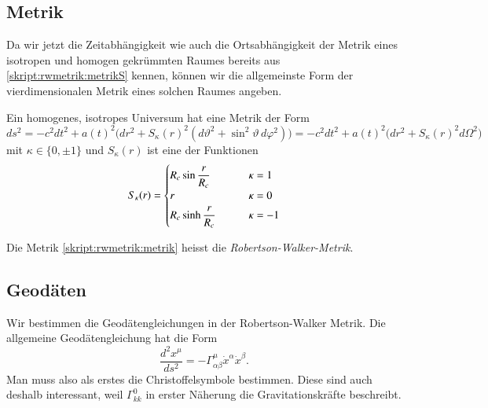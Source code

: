 \subsection{Metrik}
Da wir jetzt die Zeitabhängigkeit wie auch die Ortsabhängigkeit der
Metrik eines isotropen und homogen gekrümmten Raumes bereits aus
\eqref{skript:rwmetrik:metrikS} kennen, können
wir die allgemeinste Form der vierdimensionalen Metrik eines solchen
Raumes angeben.

\begin{satz}
Ein homogenes, isotropes Universum hat eine Metrik der Form
\begin{equation}
ds^2
=
-c^2 dt^2 + a(t)^2\bigl(
dr^2 + S_\kappa(r)^2(d\vartheta^2 + \sin^2\vartheta\, d\varphi^2)
\bigr)
=
-c^2 dt^2 + a(t)^2\bigl(
dr^2 + S_\kappa(r)^2 d\Omega^2
\bigr)
\label{skript:rwmetrik:metrik}
\end{equation}
mit $\kappa\in\{0,\pm1\}$ und 
$S_\kappa(r)$ ist eine der Funktionen
\[
S_\kappa(r)
=
\begin{cases}
R_c\sin \displaystyle\frac{\mathstrut r}{R_c}&\qquad \kappa= 1\\
r&\qquad \kappa=0\\
R_c\sinh\displaystyle\frac{\mathstrut r}{R_c}&\qquad \kappa=-1
\end{cases}
\]
\end{satz}
Die Metrik \eqref{skript:rwmetrik:metrik} heisst die
{\em Robertson-Walker-Metrik}.

\subsection{Geodäten}
Wir bestimmen die Geodätengleichungen in der Robertson-Walker Metrik.
Die allgemeine Geodätengleichung hat die Form
\[
\frac{d^2x^\mu}{ds^2} = -\Gamma^\mu_{\alpha\beta} \dot x^\alpha \dot x^\beta.
\]
Man muss also als erstes die Christoffelsymbole bestimmen.  
Diese sind auch deshalb interessant, weil $\Gamma^0_{kk}$ in erster
Näherung die Gravitationskräfte beschreibt.

